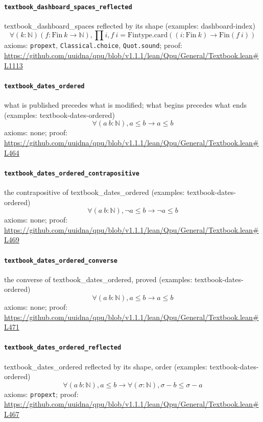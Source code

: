 \documentclass[11pt]{article}
\begin{document}
\paragraph{\texttt{textbook\_dashboard\_spaces\_reflected}}
textbook\_dashboard\_spaces reflected by its shape (examples: dashboard-index)
\[ \forall (k : \mathbb{N}) (f : \mathrm{Fin}\ k \to \mathbb{N}), \prod i, f\ i = \mathrm{Fintype.card} ((i : \mathrm{Fin}\ k) \to \mathrm{Fin} (f\ i)) \]
\noindent axioms: \texttt{propext}, \texttt{Classical.choice}, \texttt{Quot.sound}; proof: \url{https://github.com/uuidna/qpu/blob/v1.1.1/lean/Qpu/General/Textbook.lean\#L1113}

\paragraph{\texttt{textbook\_dates\_ordered}}
what is published precedes what is modified; what begins precedes what ends (examples: textbook-dates-ordered)
\[ \forall (a\ b : \mathbb{N}), a \le b \to a \le b \]
\noindent axioms: none; proof: \url{https://github.com/uuidna/qpu/blob/v1.1.1/lean/Qpu/General/Textbook.lean\#L464}

\paragraph{\texttt{textbook\_dates\_ordered\_contrapositive}}
the contrapositive of textbook\_dates\_ordered (examples: textbook-dates-ordered)
\[ \forall (a\ b : \mathbb{N}), \neg a \le b \to \neg a \le b \]
\noindent axioms: none; proof: \url{https://github.com/uuidna/qpu/blob/v1.1.1/lean/Qpu/General/Textbook.lean\#L469}

\paragraph{\texttt{textbook\_dates\_ordered\_converse}}
the converse of textbook\_dates\_ordered, proved (examples: textbook-dates-ordered)
\[ \forall (a\ b : \mathbb{N}), a \le b \to a \le b \]
\noindent axioms: none; proof: \url{https://github.com/uuidna/qpu/blob/v1.1.1/lean/Qpu/General/Textbook.lean\#L471}

\paragraph{\texttt{textbook\_dates\_ordered\_reflected}}
textbook\_dates\_ordered reflected by its shape, order (examples: textbook-dates-ordered)
\[ \forall (a\ b : \mathbb{N}), a \le b \to \forall (\sigma : \mathbb{N}), \sigma - b \le \sigma - a \]
\noindent axioms: \texttt{propext}; proof: \url{https://github.com/uuidna/qpu/blob/v1.1.1/lean/Qpu/General/Textbook.lean\#L467}
\end{document}
